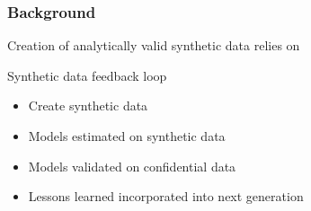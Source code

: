 \begin{frame}
\frametitle{Background}
Creation of analytically valid synthetic data relies on
\begin{block}{Synthetic data feedback loop}
\begin{itemize}[<+->]
\item Create synthetic data
\item Models estimated on synthetic data
\item Models validated on confidential data
\item Lessons learned incorporated into next generation
\end{itemize}
\end{block}
\centering
{}
\end{frame}




\newcommand{\mydraw}{  \node[draw, circle ] at ({360/\n * (\s - 1)}:\radius) {\label};
  \draw[->, >=latex] ({360/\n * (\s - 1)+\margin}:\radius) 
    arc ({360/\n * (\s - 1)+\margin}:{360/\n * (\s)-\margin}:\radius);
}
\newcommand{\mydrawblue}{  \node[draw, circle, fill=blue!20 ] at ({360/\n * (\s - 1)}:\radius) {\label};}
\newcommand{\mydrawgrey}{  \node[draw, circle, fill=black!10 ] at ({360/\n * (\s - 1)}:\radius) {\label};}
\newcommand{\mydrawline}{  \draw[->, >=latex] ({360/\n * (\s - 1)+\margin}:\radius) 
    arc ({360/\n * (\s - 1)+\margin}:{360/\n * (\s)-\margin}:\radius);
}


